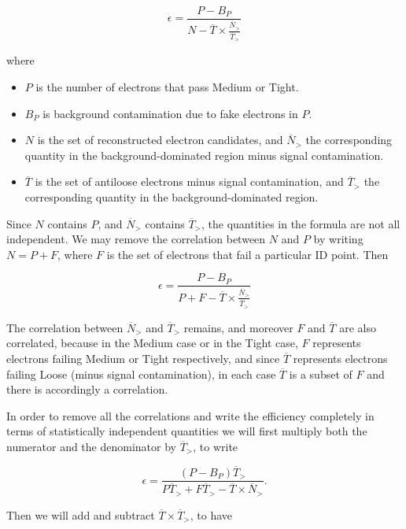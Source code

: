 $$
	\epsilon = \frac{P-B_P}{N - \overline{T} \times \frac{\overline{N}_>}{\overline{T}_>}}
$$

where

\begin{itemize}
	\item $P$ is the number of electrons that pass Medium or Tight.

	\item $B_P$ is background contamination due to fake electrons in $P$.

	\item $N$ is the set of reconstructed electron candidates, and $\overline{N}_>$
	      the corresponding quantity in the background-dominated region minus signal
	      contamination.

	\item $\overline{T}$ is the set of antiloose electrons minus signal
	      contamination, and $\overline{T}_>$ the corresponding quantity in the
	      background-dominated region.

\end{itemize}

Since $N$ contains $P$, and $\overline{N}_>$ contains $\overline{T}_>$, the
quantities in the formula are not all independent. We may remove the
correlation between $N$ and $P$ by writing $N = P + F$, where $F$ is the set of
electrons that fail a particular ID point. Then

$$
	\epsilon = \frac{P-B_P}{P + F - \overline{T} \times \frac{\overline{N}_>}{\overline{T}_>}}
$$


The correlation between $\overline{N}_>$ and $\overline{T}_>$ remains, and
moreover $F$ and $\overline{T}$ are also correlated, because in the Medium case
or in the Tight case, $F$ represents electrons failing Medium or Tight
respectively, and since $\overline{T}$ represents electrons failing Loose
(minus signal contamination), in each case $\overline{T}$ is a subset of $F$
and there is accordingly a correlation.

In order to remove all the correlations and write the efficiency completely in
terms of statistically independent quantities we will first multiply both the
numerator and the denominator by $\overline{T}_>$, to write

$$
	\epsilon = \frac{(P-B_P)\overline{T}_>}{P\overline{T}_> + F\overline{T}_> - \overline{T}\times \overline{N}_>}.
$$

Then we will add and subtract $\overline{T} \times \overline{T}_>$, to have


